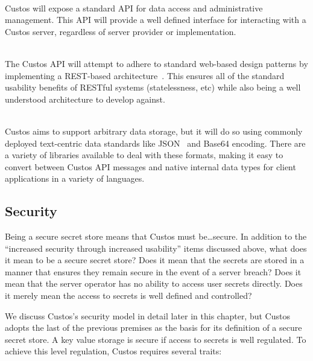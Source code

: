 \begin{packed_desc}
\item[Well Defined API] \hfill \\ Custos will expose a standard API
  for data access and administrative management. This API will provide
  a well defined interface for interacting with a Custos server,
  regardless of server provider or implementation.
\item[Standard Design Patterns] \hfill \\ The Custos API will attempt
  to adhere to standard web-based design patterns by implementing a
  REST-based architecture~\cite{ibm-restful}. This ensures all of the
  standard usability benefits of RESTful systems (statelessness, etc)
  while also being a well understood architecture to develop against.
\item[Standard Data Formats] \hfill \\ Custos aims to support
  arbitrary data storage, but it will do so using commonly deployed
  text-centric data standards like JSON~\cite{json} and Base64
  encoding. There are a variety of libraries available to deal with
  these formats, making it easy to convert between Custos API messages
  and native internal data types for client applications in a variety
  of languages.
\end{packed_desc}

\subsection{Security}

Being a secure secret store means that Custos must be\ldots secure.
In addition to the ``increased security through increased usability''
items discussed above, what does it mean to be a secure secret store?
Does it mean that the secrets are stored in a manner that ensures they
remain secure in the event of a server breach? Does it mean that the
server operator has no ability to access user secrets directly. Does
it merely mean the access to secrets is well defined and controlled?

We discuss Custos's security model in detail later in this chapter,
but Custos adopts the last of the previous premises as the basis for
its definition of a secure secret store. A key value storage is secure
if access to secrets is well regulated. To achieve this level
regulation, Custos requires several traits:

